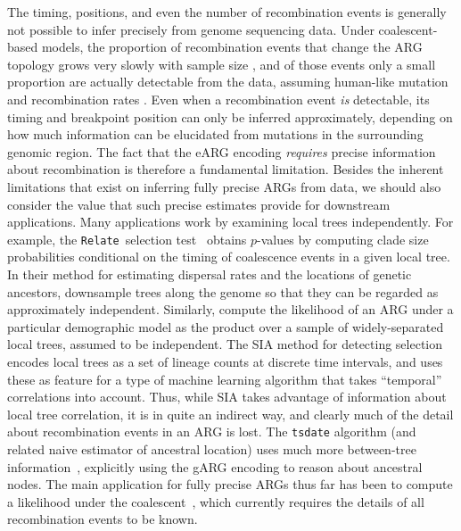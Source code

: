 \documentclass{article}
\newcommand{\relate}[0]{\texttt{Relate}}
\begin{document}
The timing, positions, and even the number of recombination events is generally
not possible to infer precisely from genome sequencing data. Under
coalescent-based models, the proportion of recombination events that change the
ARG topology grows very slowly with sample size \citep{hein2004gene}, and of those
events only a small proportion are actually detectable from the data, assuming
human-like mutation and recombination rates \citep{myers2002detection,hayman2023recoverability}.
Even when a recombination event \emph{is} detectable, its timing and breakpoint
position can only be inferred approximately, depending on how much information
can be elucidated from mutations in the surrounding genomic region.
The fact that the eARG encoding \emph{requires}
precise information about recombination is therefore a fundamental limitation.
Besides the inherent limitations that exist on inferring fully
precise ARGs from data,
we should also consider the value that such precise estimates provide
for downstream applications.
Many applications work by examining local trees independently.
For example, the \relate\ selection test~\citep{speidel2019method}
obtains $p$-values by computing clade size probabilities conditional
on the timing of coalescence events in a given local tree.
In their method
for estimating dispersal rates and the locations of genetic
ancestors,
\cite{osmond2021estimating} downsample trees along the genome
so that they can be regarded as approximately independent.
Similarly, \cite{fan2023likelihood} compute the likelihood
of an ARG under a particular demographic model as the product
over a sample of widely-separated local trees, assumed to be independent.
The SIA method for detecting selection~\citep{hejase2022deep}
encodes local trees as a set of lineage counts at discrete
time intervals, and uses these as feature for a
type of machine learning algorithm
that takes ``temporal'' correlations into account.
Thus, while SIA takes advantage of information about local tree correlation,
it is in quite an indirect way, and
clearly much of the detail about recombination events in an ARG is lost.
The \texttt{tsdate} algorithm (and related naive estimator
of ancestral location) uses much more between-tree
information~\citep{wohns2022unified}, explicitly using the gARG
encoding to reason about ancestral nodes.
The main application for fully precise ARGs thus far has been
to compute a likelihood under the
coalescent~\citep[e.g.][]{kuhner2000maximum,mahmoudi2022bayesian,
guo2022recombination},
which currently requires the details of all recombination
events to be known.
\end{document}

